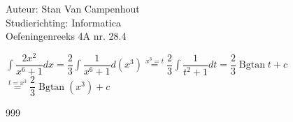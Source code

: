 \documentclass[a4paper]{article}
\begin{document}
  
\noindent \large Auteur: Stan Van Campenhout \\
\noindent \large Studierichting:  Informatica\\
\noindent \large Oefeningenreeks 4A nr. 28.4\\

\medskip

\normalsize

$ \displaystyle\int\dfrac{2x^2}{x^6 + 1}dx = \dfrac{2}{3}\displaystyle\int\dfrac{1}{x^6+1}d\left(x^3\right) 
\stackrel{x^3 = t}{=} \dfrac{2}{3}\displaystyle\int\dfrac{1}{t^2+1}dt =\dfrac{2}{3}\operatorname{Bgtan}t + c $\\

$ \stackrel{t = x^3}{=} \dfrac{2}{3}\operatorname{Bgtan}(x^3)+ c $\\

\begin{thebibliography}{999}
\end{thebibliography}
\end{document}
